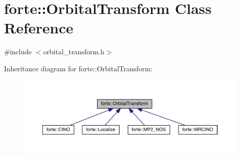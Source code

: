 \hypertarget{classforte_1_1_orbital_transform}{}\section{forte\+:\+:Orbital\+Transform Class Reference}
\label{classforte_1_1_orbital_transform}


{\ttfamily \#include $<$orbital\+\_\+transform.\+h$>$}



Inheritance diagram for forte\+:\+:Orbital\+Transform\+:
\nopagebreak
\begin{figure}[H]
\begin{center}
\leavevmode
\includegraphics[width=350pt]{classforte_1_1_orbital_transform__inherit__graph}
\end{center}
\end{figure}
